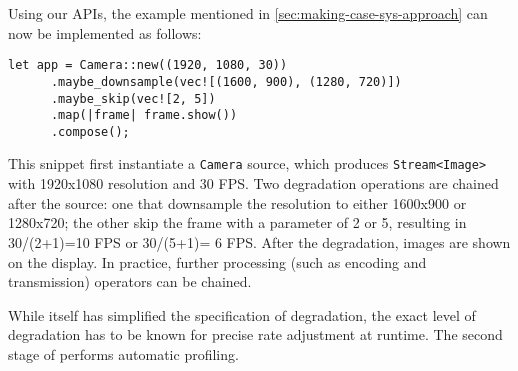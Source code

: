 Using our APIs, the example mentioned in \autoref{sec:making-case-sys-approach}
can now be implemented as follows:

\vspace{-2pt}
\begin{lstlisting}[caption={Video Processing Example}, label={lst:ex}]
   let app = Camera::new((1920, 1080, 30))
      .maybe_downsample(vec![(1600, 900), (1280, 720)])
      .maybe_skip(vec![2, 5])
      .map(|frame| frame.show())
      .compose();
\end{lstlisting}

This snippet first instantiate a \texttt{Camera} source, which produces
\texttt{Stream<Image>} with 1920x1080 resolution and 30 FPS. Two degradation
operations are chained after the source: one that downsample the resolution to
either 1600x900 or 1280x720; the other skip the frame with a parameter of 2 or
5, resulting in 30/(2+1)=10 FPS or 30/(5+1)= 6 FPS. After the degradation,
images are shown on the display. In practice, further processing (such as
encoding and transmission) operators can be chained.

While \maybe{} itself has simplified the specification of degradation, the exact
level of degradation has to be known for precise rate adjustment at runtime. The
second stage of \sysname{} performs automatic profiling.

